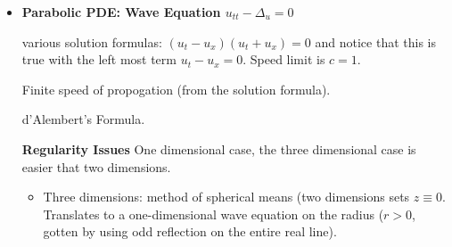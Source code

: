 \documentclass[12pt,a4paper]{report}
\begin{document}
{\begin{description}
\begin{itemize}
		\textbf{Scaling Symmetry: }If $u$ solves the Hyperbolic PDE so does $u_\lambda(x,t) = u(\lambda x, \lambda^2 t)$, because of the chain rule. Use convolution and \textbf{The Heat Kernel, $\Phi$} (not the same as above)
		
		Nicer regularity properties than the Newton Potential.
		
		Infinite speed of propagation (not true in other PDEs).
		
		\textbf{Non-homogenous} once again exclude a singularity and find a Dirac Delta function.
		
		\textbf{Maximum Principle of Parabolic boundary $\Gamma$}
		
		\textbf{Maximum Principle on an unbounded domain} More complex.  Must occur during initial conditions.  Proof is more complicated (probably not on test).
		
		\textbf{Maximum implies Uniqueness}
		
		\textbf{Regularity estimates:}
		
		Homogenous: have a solution for unbounded case, not bounded case.
		
		Unbounded: Didn't do Green's Function for Hyperbolic Equation (Heat) but you can.  Use cut off function and a double convolustion.
		
		Regularity for $u$ is defined $\dots$.
		
		\textbf{Energy Methods on bounded domain}  
		\begin{itemize}
			\item multiply by something and integrate by parts.  The most popular is $u$ itself.  This gives you a boundary term which typically goes to zero from boundary conditions.  Expected to stay the same or disipate over time.
		\end{itemize}
	
	\item \textbf{Parabolic PDE: Wave Equation $u_{tt}-\Delta_u=0$}
	
	various solution formulas: $(u_t-u_x)(u_t+u_x)=0$ and notice that this is true with the left most term $u_t-u_x=0$.  Speed limit is $c=1$.
	
	Finite speed of propogation (from the solution formula).
	
	d'Alembert's Formula.
	
	\textbf{Regularity Issues} One dimensional case, the three dimensional case is easier that two dimensions.

	\begin{itemize}
	\item	Three dimensions: method of spherical means (two dimensions sets $z\equiv 0$.  Translates to a one-dimensional wave equation on the radius ($r>0$, gotten by using odd reflection on the entire real line).
	

\end{itemize}
\end{itemize}
\end{description}}
\end{document}

